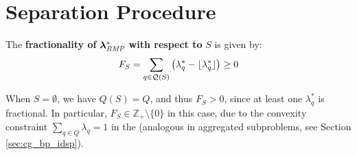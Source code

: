 \section{Separation Procedure}\label{sec:cmpbnd_separation}
\begin{definition}
The \textbf{fractionality of} ${\bm{\lambda}}^*_{\textit{RMP}}{}$ \textbf{ with respect to } $S$ is given by:
\begin{equation}\label{eq:cmpbnd_fractionality}
F_S = \sum_{q \in \mathcal{Q}(S)} \left( \lambda_q^* - \lfloor\lambda_q^*\rfloor \right) \geq 0
\end{equation}
\end{definition}

When $S = \emptyset$, we have $Q(S) = Q$, and thus $F_S > 0$, since at least one $\lambda_q^*$ is fractional. In particular, $F_S \in \mathbb{Z}_+ \setminus \{0\}$ in this case, due to the convexity constraint $\sum_{q \in Q} \lambda_q = 1$ in the \MP{} (analogous in aggregated subproblems, see Section \ref{sec:cg_bp_idsp}).

